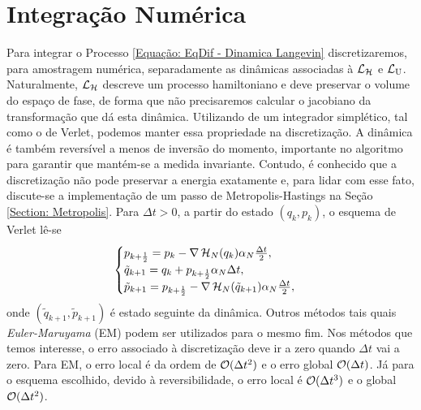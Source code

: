 \section{Integração Numérica}
\label{Seção: Discretização}


Para integrar o Processo \eqref{Equação: EqDif - Dinamica Langevin} discretizaremos, para amostragem numérica, separadamente as dinâmicas associadas à $\operatorname{\mathcal{L}}_{\operatorname{\mathcal{H}}}$ e $\operatorname{\mathcal{L}}_{\operatorname{U}}$. Naturalmente, $\operatorname{\mathcal{L}}_{\operatorname{\mathcal{H}}}$ descreve um processo hamiltoniano e deve preservar o volume do espaço de fase, de forma que não precisaremos calcular o jacobiano da transformação que dá esta dinâmica. Utilizando de um integrador simplético, tal como o de Verlet, podemos manter essa propriedade na discretização. A dinâmica é também reversível a menos de inversão do momento, importante no algoritmo para garantir que mantém-se a medida invariante. Contudo, é conhecido que a discretização não pode preservar a energia exatamente e, para lidar com esse fato, discute-se a implementação de um passo de Metropolis-Hastings na Seção \ref{Section: Metropolis}. Para $\Delta t > 0$, a partir do estado $(q_k, p_k)$, o esquema de Verlet lê-se
\begin{equation}
\begin{cases}
	p_{k+\frac{1}{2}} = p_k - \nabla \operatorname{\mathcal{H}}_N(q_k) \alpha_N \frac{\Delta t}{2}, \\
	\tilde{q}_{k+1} = q_k + p_{k + \frac{1}{2}} \alpha_N \Delta t, \\
	\tilde{p}_{k+1} = p_{k+\frac{1}{2}} - \nabla \operatorname{\mathcal{H}}_N(\tilde{q}_{k+1}) \alpha_N \frac{\Delta t}{2},
\end{cases}
\label{Equation: Verlet}
\end{equation}
onde $(\tilde{q}_{k+1}, \tilde{p}_{k+1})$ é estado seguinte da dinâmica. Outros métodos tais quais \textit{Euler-Maruyama} (EM) podem ser utilizados para o mesmo fim.  \cite[Capítulo~7]{leimmolecular} Nos métodos que temos interesse, o erro associado à discretização deve ir a zero quando $\Delta t$ vai a zero. Para EM, o erro local é da ordem de $\mathcal{O}{(\Delta t^2)}$ e o erro global $\mathcal{O}{(\Delta t)}$. Já para o esquema escolhido, devido à reversibilidade, o erro local é $\mathcal{O}{(\Delta t^3)}$ e o global $\mathcal{O}{(\Delta t^2)}$. \cite[Capítulo~5]{handbookmontecarlo} 


